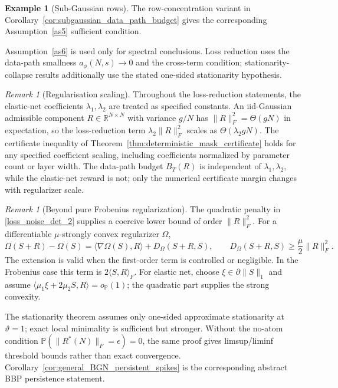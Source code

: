 \documentclass[11pt]{article}
\theoremstyle{plain}
\theoremstyle{definition}
\newtheorem{ex}[thm]{Example}
\theoremstyle{remark}
\newtheorem{rem}[thm]{Remark}
\newcommand{\PP}{\mathbb{P}}
\newcommand{\1}{\mathbf{1}}
\begin{document}
\begin{ex}[Sub-Gaussian rows]
\label{ex:subgaussian_rows}
The row-concentration variant in Corollary~\ref{cor:subgaussian_data_path_budget} gives the corresponding Assumption~\ref{as5} sufficient condition.
\end{ex}

Assumption~\ref{as6} is used only for spectral conclusions. Loss reduction uses the data-path smallness \(a_\phi(N,s)\to0\) and the cross-term condition; stationarity-collapse results additionally use the stated one-sided stationarity hypothesis.

\begin{rem}[Regularisation scaling]
\label{rem:lambda_reg_scaling}
Throughout the loss-reduction statements, the elastic-net coefficients \(\lambda_1,\lambda_2\) are treated as specified constants. An iid-Gaussian admissible component \(R\in\mathbb R^{N\times N}\) with variance \(g/N\) has \(\|R\|_F^2=\Theta(gN)\) in expectation, so the loss-reduction term \(\lambda_2\|R\|_F^2\) scales as \(\Theta(\lambda_2 gN)\). The certificate inequality of Theorem~\ref{thm:deterministic_mask_certificate} holds for any specified coefficient scaling, including coefficients normalized by parameter count or layer width. The data-path budget \(B_T(R)\) is independent of \(\lambda_1,\lambda_2\), while the elastic-net reward is not; only the numerical certificate margin changes with regularizer scale.
\end{rem}

\begin{rem}[Beyond pure Frobenius regularization]
\label{rem:bregman_regularizer}
The quadratic penalty in \eqref{loss_noise_det_2} supplies a coercive lower bound of order \(\|R\|_F^2\). For a differentiable \(\mu\)-strongly convex regularizer \(\Omega\),
\[
\Omega(S+R)-\Omega(S)=\langle\nabla\Omega(S),R\rangle+D_\Omega(S+R,S),
\qquad
D_\Omega(S+R,S)\ge\frac{\mu}{2}\|R\|_F^2.
\]
The extension is valid when the first-order term is controlled or negligible. In the Frobenius case this term is \(2\langle S,R\rangle_F\). For elastic net, choose \(\xi\in\partial\|S\|_1\) and assume \(\langle\mu_1\xi+2\mu_2S,R\rangle=o_{\PP}(1)\); the quadratic part supplies the strong convexity.
\end{rem}

The stationarity theorem assumes only one-sided approximate stationarity at \(\vartheta=1\); exact local minimality is sufficient but stronger. Without the no-atom condition \(\PP(\|R^*(N)\|_F=\epsilon)=0\), the same proof gives limsup/liminf threshold bounds rather than exact convergence. Corollary~\ref{cor:general_BGN_persistent_spikes} is the corresponding abstract BBP persistence statement.
\end{document}
